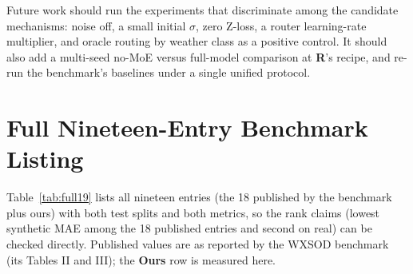 \documentclass[10pt,a4paper,twocolumn,twoside]{article}
\begin{document}
Future work should run the experiments that discriminate among the candidate mechanisms:
noise off, a small initial $\sigma$, zero Z-loss, a router learning-rate multiplier, and oracle
routing by weather class as a positive control. It should also add a multi-seed no-MoE versus full-model
comparison at \textbf{R}'s recipe, and re-run the benchmark's baselines under a single unified
protocol.

\appendix
\section{Full Nineteen-Entry Benchmark Listing}
\label{app:benchmark}

Table~\ref{tab:full19} lists all nineteen entries (the 18 published by the benchmark plus
ours) with both test
splits and both metrics, so the rank claims (lowest synthetic MAE among the 18 published entries and second on
real) can be checked directly. Published values are as reported by the WXSOD
benchmark~\cite{wxsod2025} (its Tables II and III); the \textbf{Ours} row is measured here.
\end{document}
